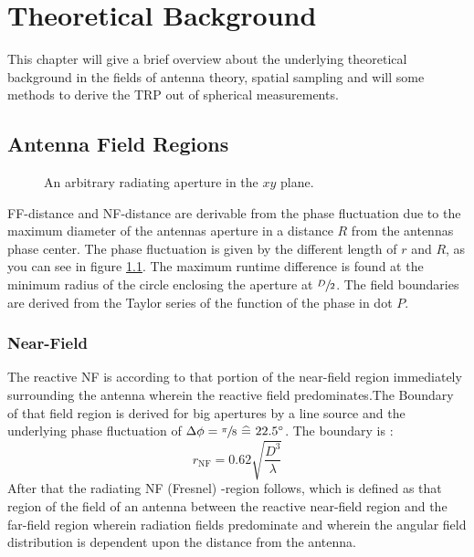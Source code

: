 \chapter{Theoretical Background}

This chapter will give a brief overview about the underlying theoretical background in the fields of antenna theory, spatial sampling and will some methods to derive the \ac{TRP} out of spherical measurements.

\section{Antenna Field Regions}
\begin{figure}[H]
\centering
\def\svgwidth{0.6\textwidth}

\caption{An arbitrary radiating aperture in the $xy$ plane. \cite{7942128}}
\label{arbaperturexy}
\end{figure}

\ac{FF}-distance and \ac{NF}-distance are derivable from the phase fluctuation due to the maximum diameter of the antennas aperture \cite{7942128} in a distance $R$ from the antennas phase center. The phase fluctuation is given by the different length of $r$ and $R$, as you can see in figure \ref{arbaperturexy}. The maximum runtime difference is found at the minimum radius of the circle enclosing the aperture at $\sfrac{D}{2}$. The field boundaries are derived from the Taylor series of the function of the phase in dot $P$. \cite{7942128}


\subsection{Near-Field}

The reactive \acf{NF} is according to \cite{balanis} \glqq that portion of the near-field region immediately surrounding the antenna wherein the reactive field predominates.\grqq{ }The Boundary of that field region is derived for big apertures by a line source and the underlying phase fluctuation of  $\Delta\phi = \sfrac{\pi}{8} \ \widehat{=}\  22.5^\circ$. The boundary is \cite{8393926}:
\begin{equation}
r_{\text{NF}} = 0.62\sqrt{\frac{D^3}{\lambda}}
\end{equation}
After that the radiating \ac{NF} (Fresnel) -region follows, which is defined as \glqq that region of the field of an antenna between the reactive near-field region and the far-field region wherein radiation fields predominate and wherein the angular field distribution is dependent upon the distance from the antenna.\grqq

